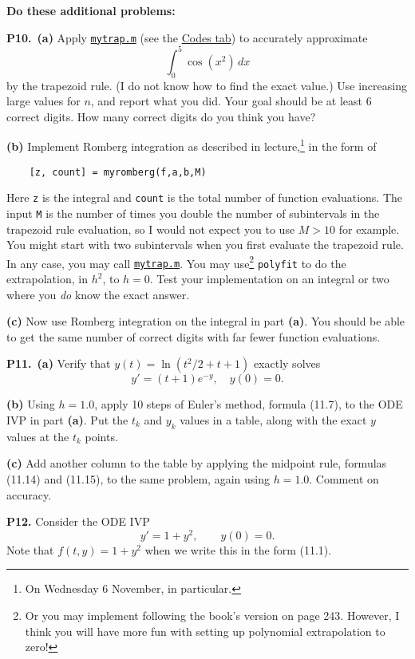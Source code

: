 \documentclass[12pt]{amsart}
\newcommand{\prob}[1]{\bigskip\noindent\textbf{#1.}\quad }
\newcommand{\epart}[1]{\medskip\noindent\textbf{(#1)}\quad }
\newcommand{\ppart}[1]{\,\textbf{(#1)}\quad }
\begin{document}
\medskip

\noindent \textbf{Do these additional problems:}

\prob{P10}  \ppart{a}  Apply \href{https://bueler.github.io/numerical/assets/codes/mytrap.m}{\texttt{mytrap.m}} (see the \href{https://bueler.github.io/numerical/codes.html}{Codes tab}) to accurately approximate
          $$\int_0^5 \cos(x^2)\,dx$$
by the trapezoid rule.  (I do not know how to find the exact value.)  Use increasing large values for $n$, and report what you did.  Your goal should be at least 6 correct digits.  How many correct digits do you think you have?

\epart{b}  Implement Romberg integration as described in lecture,\footnote{On Wednesday 6 November, in particular.} in the form of 
      
       \verb|    [z, count] = myromberg(f,a,b,M)|

\noindent Here \verb|z| is the integral and \verb|count| is the total number of function evaluations.  The input \verb|M| is the number of times you double the number of subintervals in the trapezoid rule evaluation, so I would not expect you to use $M>10$ for example.  You might start with two subintervals when you first evaluate the trapezoid rule.  In any case, you may call \href{https://bueler.github.io/numerical/assets/codes/mytrap.m}{\texttt{mytrap.m}}.  You may use\footnote{Or you may implement following the book's version on page 243.  However, I think you will have more fun with setting up polynomial extrapolation to zero!} \texttt{polyfit} to do the extrapolation, in $h^2$, to $h=0$.  Test your implementation on an integral or two where you \emph{do} know the exact answer.

\epart{c}  Now use Romberg integration on the integral in part \textbf{(a)}.  You should be able to get the same number of correct digits with far fewer function evaluations.


\prob{P11}  \ppart{a} Verify that $y(t) = \ln(t^2/2 + t + 1)$ exactly solves
	$$y'=(t+1)e^{-y}, \quad y(0)=0.$$

\epart{b}  Using $h=1.0$, apply 10 steps of Euler's method, formula (11.7), to the ODE IVP in part \textbf{(a)}.  Put the $t_k$ and $y_k$ values in a table, along with the exact $y$ values at the $t_k$ points.

\epart{c}  Add another column to the table by applying the midpoint rule, formulas (11.14) and (11.15), to the same problem, again using $h=1.0$.  Comment on accuracy.


\prob{P12} Consider the ODE IVP
        $$y'=1+y^2, \qquad y(0)=0.$$
Note that $f(t,y)=1+y^2$ when we write this in the form (11.1).
\end{document}
